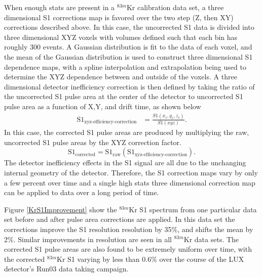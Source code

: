 \documentclass[a4paper,12pt]{article}
\begin{document}
{When enough stats are present in a $^{83m}$Kr calibration data set, a three dimensional S1 corrections map is favored over the two step (Z, then XY) corrections described above.  In this case, the uncorrected S1 data is divided into three dimensional XYZ voxels with volumes defined such that each bin has roughly 300 events. A Gaussian distribution is fit to the data of each voxel, and the mean of the Gaussian distribution is used to construct three dimensional S1 dependence maps, with a spline interpolation and extrapolation being used to determine the XYZ dependence between and outside of the voxels. A three dimensional detector inefficiency correction is then defined by taking the ratio of the uncorrected S1 pulse area at the center of the detector to uncorrected S1 pulse area as a function of X,Y, and drift time, as shown below
\begin{align}
\mbox{S}1_{\mbox{xyz-efficiency-correction}} &= \frac{S1(x_c,y_c,z_c)}{S1(xyz)}.
\end{align} 
In this case, the corrected S1 pulse areas are produced by multiplying the raw, uncorrected S1 pulse areas by the XYZ correction factor.
\begin{equation}
\mbox{S}1_{\mbox{corrected}} = \mbox{S}1_{\mbox{raw}} \left( \mbox{S}1_{\mbox{xyz-efficiency-correction}} \right).
\end{equation}
The detector inefficiency effects in the S1 signal are all due to the unchanging internal geometry of the detector.  Therefore, the S1 correction maps vary by only a few percent over time and a single high stats three dimensional correction map can be applied to data over a long period of time.  

Figure \ref{KrS1Improvement} show the $^{83m}$Kr S1 spectrum from one particular data set before and after pulse area corrections are applied. In this data set the corrections improve the S1 resolution resolution by 35\%, and shifts the mean by 2\%.  Similar improvements in resolution are seen in all $^{83m}$Kr data sets.  The corrected S1 pulse areas are also found to be extremely uniform over time, with the corrected $^{83m}$Kr S1 varying by less than 0.6\% over the course of the LUX detector's Run03 data taking campaign.


}
\end{document}
